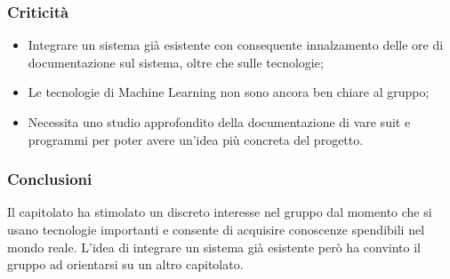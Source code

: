 		\subsubsection{Criticità}
			\begin{itemize}
				\item Integrare un sistema già esistente con consequente innalzamento delle ore di documentazione sul sistema, oltre che sulle tecnologie;
				\item Le tecnologie di Machine Learning non sono ancora ben chiare al gruppo;
				\item Necessita uno studio approfondito della documentazione di vare suit e programmi per poter avere un'idea più concreta del progetto.
			\end{itemize}

		\subsubsection{Conclusioni}
			Il capitolato ha stimolato un discreto interesse nel gruppo dal momento che si usano tecnologie importanti e consente di acquisire conoscenze spendibili nel mondo reale. L'idea di integrare un sistema già esistente però ha convinto il gruppo ad orientarsi su un altro capitolato.

